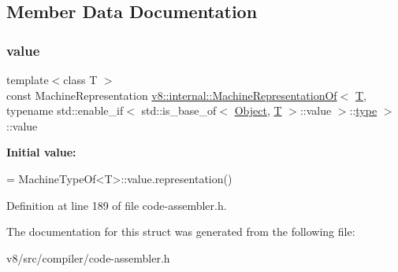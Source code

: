 \subsection{Member Data Documentation}
\mbox{\label{structv8_1_1internal_1_1MachineRepresentationOf_3_01T_00_01typename_01std_1_1enable__if_3_01std_5edb38e8202bba0bdc84b6abce010321_a66f62e0f17f89c54cc7936bf3446f91b}} 
\subsubsection{\texorpdfstring{value}{value}}
{\footnotesize\ttfamily template$<$class T $>$ \\
const Machine\+Representation \mbox{\hyperlink{structv8_1_1internal_1_1MachineRepresentationOf}{v8\+::internal\+::\+Machine\+Representation\+Of}}$<$ \mbox{\hyperlink{classv8_1_1internal_1_1torque_1_1T}{T}}, typename std\+::enable\+\_\+if$<$ std\+::is\+\_\+base\+\_\+of$<$ \mbox{\hyperlink{classv8_1_1internal_1_1Object}{Object}}, \mbox{\hyperlink{classv8_1_1internal_1_1torque_1_1T}{T}} $>$\+::value $>$\+::\mbox{\hyperlink{classstd_1_1conditional_1_1type}{type}} $>$\+::value\hspace{0.3cm}{\ttfamily [static]}}

{\bfseries Initial value\+:}
\begin{DoxyCode}
=
      MachineTypeOf<T>::value.representation()
\end{DoxyCode}


Definition at line 189 of file code-\/assembler.\+h.



The documentation for this struct was generated from the following file\+:\begin{DoxyCompactItemize}
\item 
v8/src/compiler/code-\/assembler.\+h\end{DoxyCompactItemize}
